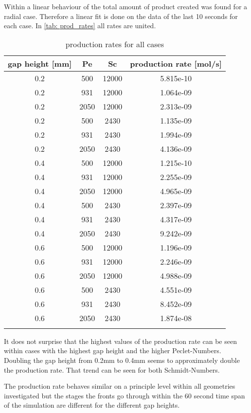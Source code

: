 \documentclass[../thesis.tex]{subfiles}
\begin{document}
Within \cite{brau2020influence} a linear behaviour of the total amount of product created was found for a radial case. Therefore a linear fit is done on the data of the last 10 seconds for each case. In \autoref{tab: prod_rates} all rates are united.
\begin{table} [htbp]
	\centering
	\caption{production rates for all cases}
	\begin{tabular}{ cccc }
		\hline
		gap height [mm] & Pe & Sc & production rate [mol/s] \\
		\hline
		0.2 & 500 & 12000 & 5.815e-10 \\
		0.2 & 931 & 12000 & 1.064e-09 \\
		0.2 & 2050 & 12000 & 2.313e-09 \\
		0.2	& 500 & 2430 & 1.135e-09 \\
		0.2	& 931 & 2430 & 1.994e-09 \\
		0.2	& 2050 & 2430 & 4.136e-09 \\
		0.4 & 500 & 12000 & 1.215e-10 \\
		0.4 & 931 & 12000 & 2.255e-09 \\
		0.4 & 2050 & 12000 & 4.965e-09 \\
		0.4	& 500 & 2430 & 2.397e-09 \\
		0.4	& 931 & 2430 & 4.317e-09 \\
		0.4	& 2050 & 2430 & 9.242e-09 \\
		0.6 & 500 & 12000 & 1.196e-09 \\
		0.6 & 931 & 12000 & 2.246e-09 \\
		0.6 & 2050 & 12000 & 4.988e-09 \\
		0.6	& 500 & 2430 & 4.551e-09 \\
		0.6	& 931 & 2430 & 8.452e-09 \\
		0.6	& 2050 & 2430 & 1.874e-08 \\
		\hline
		\label{tab: prod_rates}
	\end{tabular}
\end{table}
It does not surprise that the highest values of the production rate can be seen within cases with the highest gap height and the higher Peclet-Numbers. Doubling the gap height from 0.2mm to 0.4mm seems to approximately double the production rate. That trend can be seen for both Schmidt-Numbers.
\newline

The production rate behaves similar on a principle level within all geometries investigated but the stages the fronts go through within the 60 second time span of the simulation are different for the different gap heights. 
\end{document}
